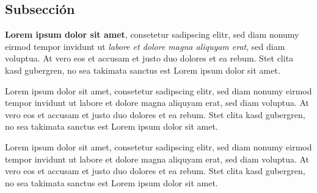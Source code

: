 \subsection{Subsección}

{\ttfamily
  \textbf{Lorem ipsum dolor sit amet}, consetetur sadipscing elitr, sed diam nonumy eirmod tempor invidunt ut \textit{labore et dolore magna aliquyam erat}, sed diam voluptua. At vero eos et accusam et justo duo dolores et ea rebum. Stet clita kasd gubergren, no sea takimata sanctus est Lorem ipsum dolor sit amet.
}

\newpage
Lorem ipsum dolor sit amet, consetetur sadipscing elitr, sed diam nonumy eirmod
tempor invidunt ut labore et dolore magna aliquyam erat, sed diam voluptua. At
vero eos et accusam et justo duo dolores et ea rebum. Stet clita kasd gubergren,
no sea takimata sanctus est Lorem ipsum dolor sit amet.

\newpage
Lorem ipsum dolor sit amet, consetetur sadipscing elitr, sed diam nonumy eirmod
tempor invidunt ut labore et dolore magna aliquyam erat, sed diam voluptua. At
vero eos et accusam et justo duo dolores et ea rebum. Stet clita kasd gubergren,
no sea takimata sanctus est Lorem ipsum dolor sit amet.
\endinput
